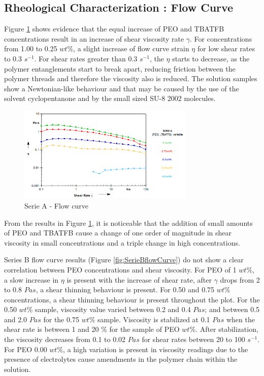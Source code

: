\subsection{Rheological Characterization : \textbf{Flow Curve}}
Figure \ref{fig:SerieAflowCurve} shows evidence that the equal increase of PEO and TBATFB concentrations result in an increase of shear viscosity rate $\gamma$. For concentrations from 1.00 to 0.25 $w t \%$, a slight increase of flow curve strain $\eta$ for low shear rates to 0.3 $s^{-1}$. For shear rates greater than 0.3 $s^{-1}$, the $\eta$ starts to decrease, as the polymer entanglements start to break apart, reducing friction between the polymer threads and therefore the viscosity also is reduced. The solution samples show a Newtonian-like behaviour and that may be caused by the use of the solvent cyclopentanone and by the small sized SU-8 2002 molecules.

\begin{figure}[th]
\centering
\includegraphics[width=0.75\textwidth]{./Figures/SerieAflowCurve.png}
\decoRule
\caption[Serie A - Flow curve]{Serie A - Flow curve}
\label{fig:SerieAflowCurve}
\end{figure}

From the results in Figure \ref{fig:SerieAflowCurve}, it is noticeable that the addition of small amounts of PEO and TBATFB cause a change of one order of magnitude in shear viscosity in small concentrations and a triple change in high concentrations.

Series B flow curve results (Figure \ref{fig:SerieBflowCurve}) do not show a clear correlation between PEO concentrations and shear viscosity. For PEO of 1 $w t \%$, a slow increase in $\eta$ is present with the increase of shear rate, after $\gamma$ drops from 2 to 0.8 $Pa s$, a shear thinning behaviour is present. For 0.50 and 0.75 $w t \%$ concentrations, a shear thinning behaviour is present throughout the plot. For the 0.50 $w t \%$ sample, viscosity value varied between 0.2 and 0.4 $Pa s$; and between 0.5 and 2.0 $Pa s$ for the 0.75 $w t \%$ sample. Viscosity is stabilized at 0.1 $Pa s$ when the shear rate is between 1 and 20 \% for the sample of PEO $w t \%$. After stabilization, the viscosity decreases from 0.1 to 0.02 $Pa s$ for shear rates between 20 to 100 $s^{-1}$. For PEO 0.00 $w t \%$, a high variation is present in viscosity readings due to the presence of electrolytes cause amendments in the polymer chain within the solution.


